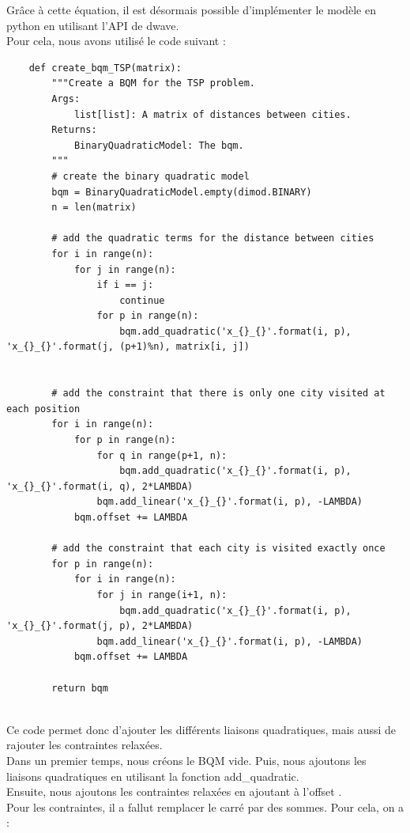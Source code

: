 \documentclass{article}
\begin{document}
        Grâce à cette équation, il est désormais possible d'implémenter le modèle en python en utilisant l'API de dwave.\\
        Pour cela, nous avons utilisé le code suivant :
        \begin{verbatim}
    def create_bqm_TSP(matrix):
        """Create a BQM for the TSP problem.
        Args:
            list[list]: A matrix of distances between cities.
        Returns:
            BinaryQuadraticModel: The bqm.
        """
        # create the binary quadratic model
        bqm = BinaryQuadraticModel.empty(dimod.BINARY)
        n = len(matrix)

        # add the quadratic terms for the distance between cities
        for i in range(n):
            for j in range(n):
                if i == j:
                    continue
                for p in range(n):
                    bqm.add_quadratic('x_{}_{}'.format(i, p), 'x_{}_{}'.format(j, (p+1)%n), matrix[i, j])


        # add the constraint that there is only one city visited at each position
        for i in range(n):
            for p in range(n):
                for q in range(p+1, n):
                    bqm.add_quadratic('x_{}_{}'.format(i, p), 'x_{}_{}'.format(i, q), 2*LAMBDA)
                bqm.add_linear('x_{}_{}'.format(i, p), -LAMBDA)
            bqm.offset += LAMBDA

        # add the constraint that each city is visited exactly once
        for p in range(n):
            for i in range(n):
                for j in range(i+1, n):
                    bqm.add_quadratic('x_{}_{}'.format(i, p), 'x_{}_{}'.format(j, p), 2*LAMBDA)
                bqm.add_linear('x_{}_{}'.format(i, p), -LAMBDA)
            bqm.offset += LAMBDA

        return bqm


        \end{verbatim}
        Ce code permet donc d'ajouter les différents liaisons quadratiques, mais aussi de rajouter les contraintes relaxées.\\
        Dans un premier temps, nous créons le BQM vide.
        Puis, nous ajoutons les liaisons quadratiques en utilisant la fonction add\_quadratic.\\
        Ensuite, nous ajoutons les contraintes relaxées en ajoutant à l'offset .\\
        Pour les contraintes, il a fallut remplacer le carré par des sommes. Pour cela, on a :
\end{document}
